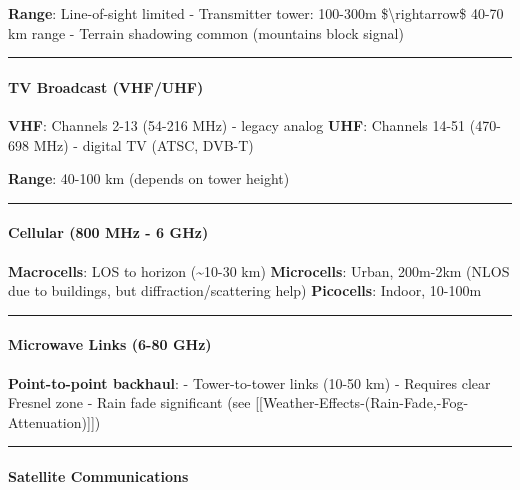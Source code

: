 \textbf{Range}: Line-of-sight limited - Transmitter tower: 100-300m
\$\textbackslash rightarrow\$ 40-70 km range - Terrain shadowing common
(mountains block signal)

\begin{center}\rule{0.5\linewidth}{0.5pt}\end{center}

\paragraph{TV Broadcast (VHF/UHF)}\label{tv-broadcast-vhfuhf}

\textbf{VHF}: Channels 2-13 (54-216 MHz) - legacy analog \textbf{UHF}:
Channels 14-51 (470-698 MHz) - digital TV (ATSC, DVB-T)

\textbf{Range}: 40-100 km (depends on tower height)

\begin{center}\rule{0.5\linewidth}{0.5pt}\end{center}

\paragraph{Cellular (800 MHz - 6 GHz)}\label{cellular-800-mhz---6-ghz}

\textbf{Macrocells}: LOS to horizon (\textasciitilde10-30 km)
\textbf{Microcells}: Urban, 200m-2km (NLOS due to buildings, but
diffraction/scattering help) \textbf{Picocells}: Indoor, 10-100m

\begin{center}\rule{0.5\linewidth}{0.5pt}\end{center}

\paragraph{Microwave Links (6-80 GHz)}\label{microwave-links-6-80-ghz}

\textbf{Point-to-point backhaul}: - Tower-to-tower links (10-50 km) -
Requires clear Fresnel zone - Rain fade significant (see
{[}{[}Weather-Effects-(Rain-Fade,-Fog-Attenuation){]}{]})

\begin{center}\rule{0.5\linewidth}{0.5pt}\end{center}

\paragraph{Satellite Communications}\label{satellite-communications}

